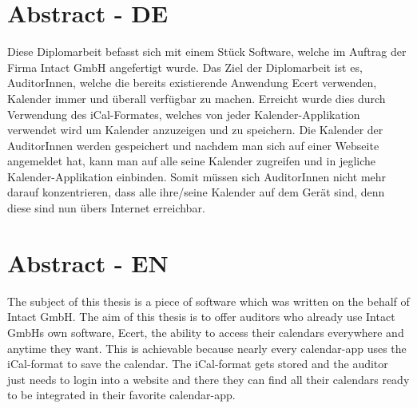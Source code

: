 

\chapter*{Abstract - DE}
\label{cha:abstract}

Diese Diplomarbeit befasst sich mit einem Stück Software, welche im Auftrag der Firma Intact GmbH angefertigt wurde. Das Ziel der Diplomarbeit ist es, AuditorInnen, welche die bereits existierende Anwendung Ecert verwenden, Kalender immer und überall verfügbar zu machen. Erreicht wurde dies durch Verwendung des iCal-Formates, welches von jeder Kalender-Applikation verwendet wird um Kalender anzuzeigen und zu speichern. Die Kalender der AuditorInnen werden gespeichert und nachdem man sich auf einer Webseite angemeldet hat, kann man auf alle seine Kalender zugreifen und in jegliche Kalender-Applikation einbinden. Somit müssen sich AuditorInnen nicht mehr darauf konzentrieren, dass alle ihre/seine Kalender auf dem Gerät sind, denn diese sind nun übers Internet erreichbar. 
\vspace{20px}
\linebreak
\pagebreak

\pagebreak

\chapter*{Abstract - EN}
\label{cha:abstract}
The subject of this thesis is a piece of software which was written on the behalf of Intact GmbH. The aim of this thesis is to offer auditors who already use Intact GmbHs own software, Ecert, the ability to access their calendars everywhere and anytime they want. This is achievable because nearly every calendar-app uses the iCal-format to save the calendar. The iCal-format gets stored and the auditor just needs to login into a website and there they can find all their calendars ready to be integrated in their favorite calendar-app.

